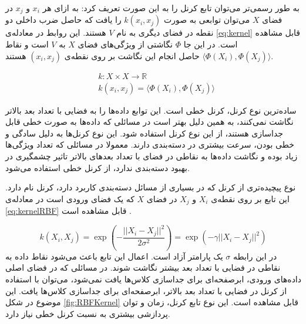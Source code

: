 به طور رسمی‌تر می‌توان تابع کرنل را به این صورت تعریف کرد: به ازای هر  $x_i$  و $x_j$ در فضای $X$ می‌توان توابعی به صورت $k(x_i,x_j)$ را یافت که حاصل ضرب داخلی دو نقطه در فضای دیگری به نام $V$ هستند. این روابط در معادله‌ی \ref{eq:kernel} قابل مشاهده است.\cite{KernelSVM} در این جا $\Phi$ نگاشتی از ویژگی‌های فضای $X$ به $V$ است و نقاط $\bigg \langle \Phi (X_i), \Phi(X_j) \bigg \rangle$ حاصل انجام این نگاشت بر روی نقطه‌ی $(x_i, x_j)$ هستند.  

\begin{equation}
\begin{split}
	& k: X \times X \to \mathbb{R} \\
	& k(x_i, x_j) = \bigg \langle \Phi (X_i), \Phi(X_j) \bigg \rangle
\end{split}
\label{eq:kernel}
\end{equation}

ساده‌ترین نوع کرنل، کرنل خطی است. این توابع  داده‌ها را به فضایی با تعداد بعد بالاتر نگاشت نمی‌کنند، به همین دلیل بهتر است در مسائلی که داده‌ها به صورت خطی قابل جداسازی هستند، از این نوع کرنل استفاده شود. 
 این نوع کرنل‌ها به دلیل سادگی و خطی بودن، سرعت بیشتری در دسته‌بندی دارند. معمولا در مسائلی که تعداد ویژگی‌ها زیاد بوده و نگاشت داده‌ها به نقاطی در فضای با تعداد بعدهای بالاتر تاثیر چشمگیری در بهبود دسته‌بندی ندارد، از کرنل خطی استفاده می‌شود. \cite{LinearSVM} 
 
 نوع پیچیده‌تری از کرنل که در بسیاری از مسائل دسته‌بندی کاربرد دارد، کرنل  نام دارد. این تابع بر روی نقطه‌ی $X_i$ و $X_j$ در فضای $X$ که یک فضای ورودی است در معادله‌ی \ref{eq:kernelRBF} قابل مشاهده است \cite{kernelRBF}.
   
\begin{equation}
	 k(X_i, X_j) = \exp(-\frac{{||X_i-X_j||}^2}{2\sigma^2}) = \exp(-\gamma{{||X_i-X_j||}^2})
\label{eq:kernelRBF}
\end{equation}
در این رابطه $\sigma$ یک پارامتر آزاد است. اعمال این تابع باعث می‌شود نقاط داده به نقاطی در فضایی با تعداد بعد بیشتر نگاشت شوند. در مسائلی که در فضای اصلی داده‌های ورودی، ابرصفحه‌ای برای جداسازی کلاس‌ها یافت نمی‌شود، می‌توان با استفاده از کرنل  در فضایی با تعداد بعد بالاتر، ابرصفحه‌ای برای جداسازی کلاس‌ها یافت. این موضوع در شکل \ref{fig:RBFKernel} قابل مشاهده است. این نوع تابع کرنل، زمان و توان پردازشی بیشتری به نسبت کرنل خطی نیاز دارد.

